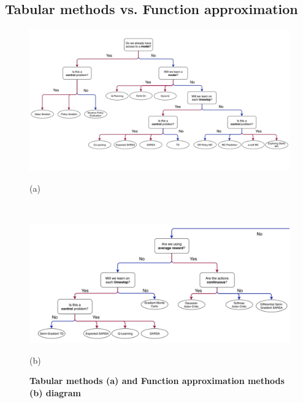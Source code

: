 \documentclass[11pt]{article}
\begin{document}
\subsection{Tabular methods vs. Function approximation}
\begin{figure}
\begin{minipage}[t]{1\linewidth}
  \centering
  \centerline{\includegraphics[scale = 0.3]{diagram_tabluar_methods.png}}
  \vspace{-7pt}
  \centerline{\footnotesize{(a)}}
\end{minipage}\\
\begin{minipage}[t]{1\linewidth}
  \centering
  \centerline{\includegraphics[scale = 0.3]{diagram_function_approximation_methods.png}}
  \vspace{-7pt}
  \centerline{\footnotesize{(b)}}
\end{minipage}
\caption{\footnotesize{\textbf{Tabular methods (a) and Function approximation methods (b) diagram}}}
\label{fig: diagram_tabluar_function_approximation_methods}
\end{figure}
\end{document}
